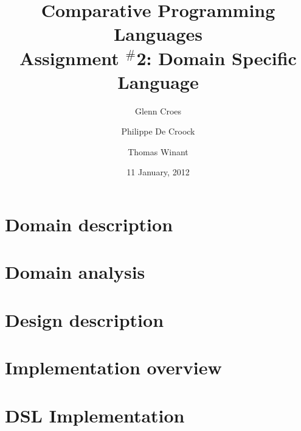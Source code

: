 \documentclass[a4paper]{article}
\begin{document}

\title{Comparative Programming Languages\\
Assignment $^{\#}$2: Domain Specific Language}
\author{Glenn Croes \and Philippe De Croock \and Thomas Winant}
\date{11 January, 2012}

\maketitle

\section{Domain description}
\label{sec:domain-description}



\section{Domain analysis}
\label{sec:domain-analysis}


\section{Design description}
\label{sec:design-description}


\section{Implementation overview}
\label{sec:implementation-overview}


\section{DSL Implementation}
\label{sec:dsl-implementation}
\end{document}
